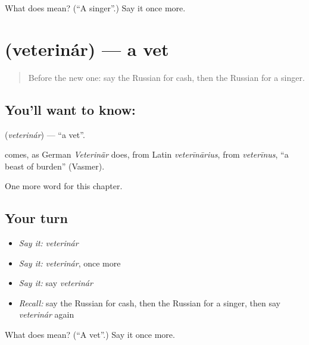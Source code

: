 \begin{tcolorbox}[breakable,colback=teal!4,colframe=teal!35!black,title={Before you move on}]
What does  mean? (\textquotedblleft{}A singer\textquotedblright{}.) Say it once more.
\end{tcolorbox}
\section[\texorpdfstring{\ru{ветеринар} (veterinár)}{ветеринар (veterinár)}]{ (veterinár) — a vet}

\label{lesson:RU-C171-veterinar}



\begin{quote}
Before the new one: say the Russian for cash, then the Russian for a singer.
\end{quote}

\subsection*{You'll want to know: }
\textbf{} (\emph{veterinár}) — \textquotedblleft{}a vet\textquotedblright{}.

\begin{cousinweb}
\textbf{} comes, as German \emph{Veterinär} does, from Latin \emph{veterīnārius}, from \emph{veterīnus}, \textquotedblleft{}a beast of burden\textquotedblright{} (Vasmer).
\end{cousinweb}

\begin{grammarlens}[title={What you've built}]
One more word for this chapter.
\end{grammarlens}

\subsection*{Your turn}
\begin{itemize}
\raggedright
  \item \emph{Say it:} \emph{veterinár}
  \item \emph{Say it:} \emph{veterinár}, once more
  \item \emph{Say it:} say \emph{veterinár}
  \item \emph{Recall:} say the Russian for cash, then the Russian for a singer, then say \emph{veterinár} again
\end{itemize}

\begin{tcolorbox}[breakable,colback=teal!4,colframe=teal!35!black,title={Before you move on}]
What does  mean? (\textquotedblleft{}A vet\textquotedblright{}.) Say it once more.
\end{tcolorbox}
